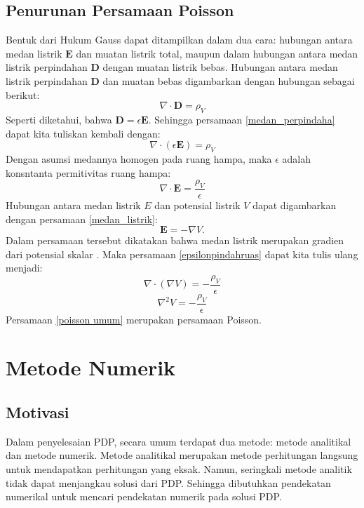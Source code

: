 \subsection{Penurunan Persamaan Poisson}
Bentuk dari Hukum Gauss dapat ditampilkan dalam dua cara: hubungan antara medan listrik $\textbf{E}$ dan muatan listrik total, maupun dalam hubungan antara medan listrik perpindahan $\textbf{D}$ dengan muatan listrik bebas\citep{grant_1990_electromagnetism}. Hubungan antara medan listrik perpindahan $\textbf{D}$ dan muatan bebas digambarkan dengan hubungan sebagai berikut:
\begin{equation}\label{medan_perpindaha}
    \nabla \cdot \textbf{D} = \rho_{V}
\end{equation}
Seperti diketahui, bahwa $\textbf{D} = \epsilon \textbf{E}$. Sehingga persamaan \eqref{medan_perpindaha} dapat kita tuliskan kembali dengan:
\begin{equation}\label{epsilon_dot_e}
    \nabla \cdot (\epsilon \textbf{E}) = {\rho_V}
\end{equation}
Dengan asumsi medannya homogen pada ruang hampa, maka $\epsilon$ adalah konsntanta permitivitas ruang hampa:
\begin{equation}\label{epsilonpindahruas}
    \nabla \cdot \textbf{E} = \frac{\rho_V}{\epsilon}
\end{equation}
Hubungan antara medan listrik $E$ dan potensial listrik $V$ dapat digambarkan dengan persamaan \eqref{medan_listrik}:
\begin{equation}\label{medan_listrik}
    \textbf{E} = -\nabla V.
\end{equation}
Dalam persamaan tersebut dikatakan bahwa medan listrik merupakan gradien dari potensial skalar \citep{davidjeffreygriffiths_2018_introduction}. Maka persamaan \eqref{epsilonpindahruas} dapat kita tulis ulang menjadi:
\begin{equation}
    \nabla \cdot (\nabla V) = - \frac{\rho_V}{\epsilon}
\end{equation}
\begin{equation}\label{poisson umum}
    \nabla ^2 V = - \frac{\rho_V}{\epsilon}
\end{equation}
Persamaan \eqref{poisson umum} merupakan persamaan Poisson.

\section{Metode Numerik}
\subsection{Motivasi}
Dalam penyelesaian PDP, secara umum terdapat dua metode: metode analitikal dan metode numerik. Metode analitikal merupakan metode perhitungan langsung untuk mendapatkan perhitungan yang eksak. Namun, seringkali metode analitik tidak dapat menjangkau solusi dari PDP. Sehingga dibutuhkan pendekatan numerikal untuk mencari pendekatan numerik pada solusi PDP.

